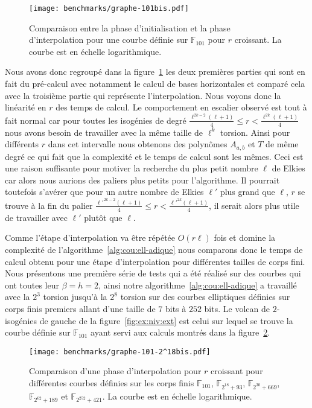 \documentclass[10pt,a4paper]{book}
\theoremstyle{plain}
\theoremstyle{definition}
\theoremstyle{definition}
\theoremstyle{definition}
\theoremstyle{definition}
\theoremstyle{definition}
\theoremstyle{remark}
\theoremstyle{remark}
\theoremstyle{definition}
\begin{document}
\begin{figure}
\texttt{[image: benchmarks/graphe-101bis.pdf]} 
\caption{\label{fig:exp:uni} Comparaison entre la phase d'initialisation et la phase d'interpolation pour une courbe définie sur $\mathbb{F}_{101}$ pour $r$ croissant. La courbe est en échelle logarithmique.}
\end{figure}


Nous avons donc regroupé dans la figure~\ref{fig:exp:uni} les deux premières 
parties qui sont en fait du pré-calcul avec notamment le calcul de bases 
horizontales et comparé cela avec la troisième partie qui représente 
l'interpolation. Nous voyons donc la linéarité en $r$ des temps de calcul. 
Le comportement en escalier observé est tout à fait normal car pour toutes les 
isogénies de degré $\frac{\ell^{2k-2}(\ell+1)}{4} \leqslant r < 
\frac{\ell^{2k}(\ell+1)}{4}$ nous avons besoin de travailler avec la même 
taille de $\ell^{k}$ torsion. Ainsi pour différents $r$ dans cet intervalle 
nous obtenons des polynômes $A_{a,b}$ et $T$ de même degré ce qui fait que la 
complexité et le temps de calcul sont les mêmes. 
Ceci est une raison suffisante pour motiver la recherche du plus petit nombre 
$\ell$ de Elkies car alors nous aurions des paliers plus petits pour 
l'algorithme. Il pourrait toutefois s'avérer que pour un autre nombre de Elkies
$\ell'$ plus grand que $\ell$, $r$ se trouve à la fin du palier 
$\frac{\ell'^{2k-2}(\ell+1)}{4} \leqslant r < \frac{\ell'^{2k}(\ell+1)}{4}$, 
il serait alors plus utile de travailler avec $\ell'$ plutôt que $\ell$.

Comme l'étape d'interpolation va être répétée $O(r \ell)$ fois et domine la 
complexité de l'algorithme~\ref{alg:cou:ell-adique} nous comparons donc le temps 
de calcul obtenu pour une étape d'interpolation pour différentes tailles de 
corps fini.
Nous présentons une première série de tests qui a été réalisé sur des 
courbes qui ont toutes leur $\beta=h=2$, ainsi notre 
algorithme~\ref{alg:cou:ell-adique} a travaillé avec la $2^3$ torsion jusqu'à la 
$2^8$ torsion sur des courbes elliptiques définies sur corps finis premiers 
allant d'une taille de $7$ bits à $252$ bits. Le volcan de $2$-isogénies de 
gauche de la figure~\ref{fig:ex:niv:ext} est celui sur lequel se trouve la 
courbe définie sur $\mathbb{F}_{101}$ ayant servi aux calculs montrés dans la 
figure~\ref{fig:exp:dif}.

\begin{figure}
\begin{center}
%
\texttt{[image: benchmarks/graphe-101-2^18bis.pdf]} 
%
\caption{\label{fig:exp:dif} Comparaison d'une phase d'interpolation pour $r$ croissant pour différentes courbes définies sur les corps finis $\mathbb{F}_{101}$, $\mathbb{F}_{2^{18}+93 }$, $\mathbb{F}_{2^{30}+669}$, $\mathbb{F}_{2^{62}+189}$ et $\mathbb{F}_{2^{252}+421}$. La courbe est en échelle logarithmique.}
\end{center}
\end{figure}
\end{document}
